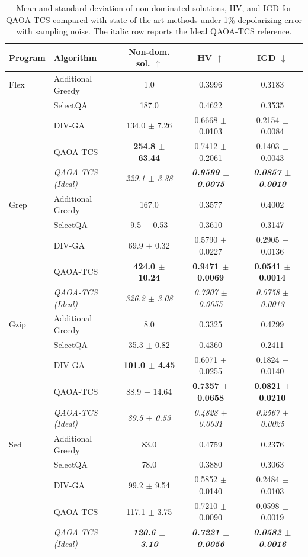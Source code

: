 \begin{table}[ht]
\centering
\scriptsize
\setlength{\tabcolsep}{3pt}
\caption{Mean and standard deviation of non-dominated solutions, HV, and IGD for QAOA-TCS compared with state-of-the-art methods under 1\% depolarizing error with sampling noise. The italic row reports the Ideal QAOA-TCS reference.}
\label{tab:noise1_means}
\begin{tabular}{llccc}
\toprule
\textbf{Program} & \textbf{Algorithm} & \textbf{Non-dom. sol.} $\uparrow$ & \textbf{HV} $\uparrow$ & \textbf{IGD} $\downarrow$ \\
\midrule
Flex & Additional Greedy & 1.0 & 0.3996 & 0.3183 \\
 & SelectQA & 187.0 & 0.4622 & 0.3535 \\
 & DIV-GA & 134.0 $\pm$ 7.26 & 0.6668 $\pm$ 0.0103 & 0.2154 $\pm$ 0.0084 \\
 & QAOA-TCS & \textbf{254.8 $\pm$ 63.44} & 0.7412 $\pm$ 0.2061 & 0.1403 $\pm$ 0.0043 \\
 & \textit{QAOA-TCS (Ideal)} & \textit{229.1 $\pm$ 3.38} & \textbf{\textit{0.9599 $\pm$ 0.0075}} & \textbf{\textit{0.0857 $\pm$ 0.0010}} \\
\midrule
Grep & Additional Greedy & 167.0 & 0.3577 & 0.4002 \\
 & SelectQA & 9.5 $\pm$ 0.53 & 0.3610 & 0.3147 \\
 & DIV-GA & 69.9 $\pm$ 0.32 & 0.5790 $\pm$ 0.0227 & 0.2905 $\pm$ 0.0136 \\
 & QAOA-TCS & \textbf{424.0 $\pm$ 10.24} & \textbf{0.9471 $\pm$ 0.0069} & \textbf{0.0541 $\pm$ 0.0014} \\
 & \textit{QAOA-TCS (Ideal)} & \textit{326.2 $\pm$ 3.08} & \textit{0.7907 $\pm$ 0.0055} & \textit{0.0758 $\pm$ 0.0013} \\
\midrule
Gzip & Additional Greedy & 8.0 & 0.3325 & 0.4299 \\
 & SelectQA & 35.3 $\pm$ 0.82 & 0.4360 & 0.2411 \\
 & DIV-GA & \textbf{101.0 $\pm$ 4.45} & 0.6071 $\pm$ 0.0255 & 0.1824 $\pm$ 0.0140 \\
 & QAOA-TCS & 88.9 $\pm$ 14.64 & \textbf{0.7357 $\pm$ 0.0658} & \textbf{0.0821 $\pm$ 0.0210} \\
 & \textit{QAOA-TCS (Ideal)} & \textit{89.5 $\pm$ 0.53} & \textit{0.4828 $\pm$ 0.0031} & \textit{0.2567 $\pm$ 0.0025} \\
\midrule
Sed & Additional Greedy & 83.0 & 0.4759 & 0.2376 \\
 & SelectQA & 78.0 & 0.3880 & 0.3063 \\
 & DIV-GA & 99.2 $\pm$ 9.54 & 0.5852 $\pm$ 0.0140 & 0.2484 $\pm$ 0.0103 \\
 & QAOA-TCS & 117.1 $\pm$ 3.75 & 0.7210 $\pm$ 0.0090 & 0.0598 $\pm$ 0.0019 \\
 & \textit{QAOA-TCS (Ideal)} & \textbf{\textit{120.6 $\pm$ 3.10}} & \textbf{\textit{0.7221 $\pm$ 0.0056}} & \textbf{\textit{0.0582 $\pm$ 0.0016}} \\
\bottomrule
\end{tabular}%
\end{table}

